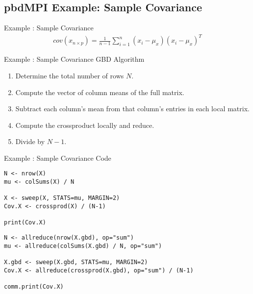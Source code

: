 \subsection{pbdMPI Example: Sample Covariance}
\makesubcontentsslidessec


\begin{frame}
  \begin{block}{Example \countex :  Sample Covariance}\pause
  \begin{align*}
    cov(x_{n\times p}) = \frac{1}{n-1}\sum_{i=1}^n\left(x_i-\mu_x\right)\left(x_i-\mu_x\right)^T
  \end{align*}
  \end{block}
\end{frame}


\begin{frame}
  \begin{block}{Example \showex :  Sample Covariance GBD Algorithm}\pause
    \begin{enumerate}
     \item Determine the total number of rows $N$.
     \item Compute the vector of column means of the full matrix.
     \item Subtract each column's mean from that column's entries in each local matrix.
     \item Compute the crossproduct locally and reduce.
     \item Divide by $N-1$.
    \end{enumerate}
  \end{block}
\end{frame}


\begin{frame}[fragile]
  \begin{exampleblock}{Example \showex :  Sample Covariance Code}\pause
\begin{lstlisting}[title=Serial Code]
N <- nrow(X)
mu <- colSums(X) / N

X <- sweep(X, STATS=mu, MARGIN=2)
Cov.X <- crossprod(X) / (N-1)

print(Cov.X)
\end{lstlisting}
  
\begin{lstlisting}[title=Parallel Code]
N <- allreduce(nrow(X.gbd), op="sum")
mu <- allreduce(colSums(X.gbd) / N, op="sum")

X.gbd <- sweep(X.gbd, STATS=mu, MARGIN=2)
Cov.X <- allreduce(crossprod(X.gbd), op="sum") / (N-1)

comm.print(Cov.X)
\end{lstlisting}
  \end{exampleblock}
\end{frame}
